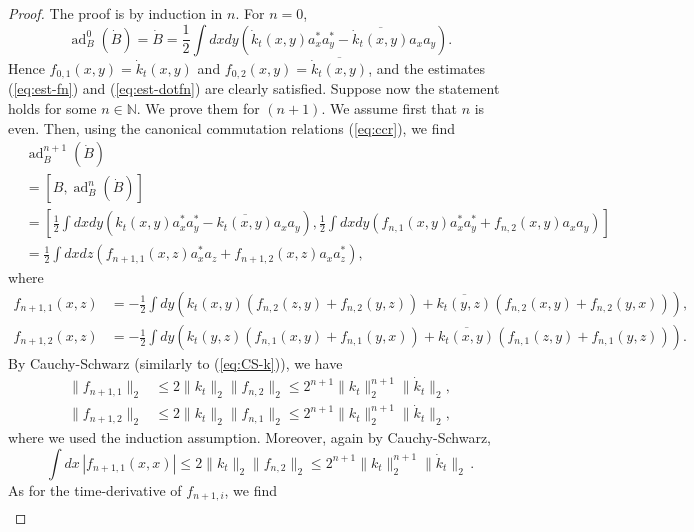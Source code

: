 \documentclass[11pt,a4paper]{article}
\newcommand{\bN}{{\mathbb N}}
\newcommand{\ad}{\operatorname{ad}}	%
\newcommand{\di}{{d}}		%
\newcommand{\cc}[1]{\overline{#1}}	%
\newcommand{\norm}[1]{\lVert#1\rVert}	%
\newcommand{\be}[1]{\begin{equation}\label{eq:#1}}	%
\newcommand{\bd}{\begin{displaymath}}			%
\newcommand{\ed}{\end{displaymath}}
\begin{document}
\begin{proof} The proof is by induction in $n$. For $n = 0$,
\bd
\ad^0_B(\dot B) = \dot B = \frac{1}{2}\int \di x\di y\left( \dot k_t (x,y) a^\ast_x a^\ast_y - \cc{\dot k_t (x,y)} a_x a_y \right).
\ed
Hence $f_{0,1} (x,y) = \dot{k}_t (x,y)$ and $f_{0,2} (x,y) = \cc{\dot{k}_t (x,y)}$, and the estimates (\ref{eq:est-fn}) and (\ref{eq:est-dotfn}) are clearly satisfied. Suppose now the statement holds for some $n \in \bN$. 
We prove them for $(n+1)$. We assume first that $n$ is even. Then, using the canonical commutation relations (\ref{eq:ccr}), we find
\begin{align*}
& \ad^{n+1}_B(\dot B) \\ & = [B,\ad^n_B(\dot B)] \\
& = \left[\frac{1}{2} \int \di x\di y\left( k_t (x,y)a^\ast_x a^\ast_y - \cc{k_t (x,y)}a_x a_y \right), \frac{1}{2}\int \di x\di y\left( f_{n,1}(x,y) a^\ast_x a^\ast_y + f_{n,2}(x,y) a_x a_y \right)\right] \\
& = \frac{1}{2} \int \di x\di z \left(f_{n+1,1}(x,z) a^\ast_x a_z + f_{n+1,2}(x,z) a_x a^\ast_z \right),
\end{align*}
where
\begin{equation}
\label{eq:even}
\begin{split}
f_{n+1,1}(x,z) & = -\frac{1}{2} \int \di y \left( k_t (x,y) \left(
f_{n,2}(z,y) + f_{n,2}(y,z) \right) + \cc{k_t (y,z)}\left( f_{n,2}(x,y) +
f_{n,2}(y,x)\right) \right),\\
f_{n+1,2}(x,z) & = -\frac{1}{2} \int \di y \left( k_t (y,z) \left( f_{n,1}(x,y) + f_{n,1}(y,x) \right) + \cc{k_t (x,y)}\left( f_{n,1}(z,y) + f_{n,1}(y,z)\right) \right) .
\end{split}
\end{equation}
By Cauchy-Schwarz (similarly to (\ref{eq:CS-k})), we have
\be{normnorm}
\begin{split}
\norm{f_{n+1,1}}_{2} & \leq 2 \| k_t  \|_2 \| f_{n,2} \|_2 \leq 2^{n+1} \|
k_t \|^{n+1}_2 \| \dot k_t \|_2, \\
\| f_{n+1 ,2} \|_2 & \leq 2 \| k_t \|_2 \| f_{n,1} \|_2 \leq 2^{n+1} \| k_t
\|^{n+1}_2 \| \dot k_t \|_2,
\end{split} 
\end{equation}
where we used the induction assumption. Moreover, again by Cauchy-Schwarz,
\[ \int dx \, |f_{n+1 ,1} (x,x)|  \leq 2 \| k_t \|_2 \| f_{n,2} \|_2 \leq 2^{n+1} \| k_t \|^{n+1}_2 \| \dot k_t \|_2 \,. \]
As for the time-derivative of $f_{n+1,i}$, we find
\[ \begin{split}

\end{split}\]
\end{proof}
\end{document}
